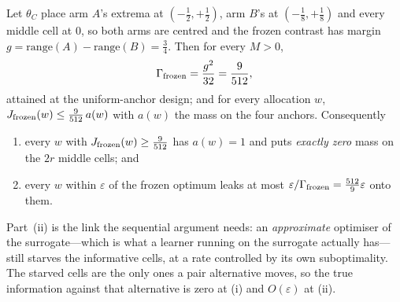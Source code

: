 

\begin{theorem}
\label{thm:starve}
Let $\theta_{C}$ place arm $A$'s extrema at $(-\tfrac12,+\tfrac12)$, arm $B$'s at
$(-\tfrac18,+\tfrac18)$ and every middle cell at $0$, so both arms are centred and the
frozen contrast has margin $g=\mathrm{range}(A)-\mathrm{range}(B)=\tfrac34$. Then for every
$M>0$,
\[
\Gamma_{\rm frozen}=\frac{g^{2}}{32}=\frac{9}{512},
\]
attained at the uniform-anchor design; and for every allocation $w$,
$J_{\rm frozen}(w)\le\tfrac{9}{512}\,a(w)$ with $a(w)$ the mass on the four anchors.
Consequently
\begin{enumerate}
\item[(i)] every $w$ with $J_{\rm frozen}(w)\ge\tfrac{9}{512}$ has $a(w)=1$ and puts
\emph{exactly zero} mass on the $2r$ middle cells; and
\item[(ii)] every $w$ within $\varepsilon$ of the frozen optimum leaks at most
$\varepsilon/\Gamma_{\rm frozen}=\tfrac{512}{9}\varepsilon$ onto them.
\end{enumerate}
\end{theorem}

Part~(ii) is the link the sequential argument needs: an \emph{approximate} optimiser of the
surrogate---which is what a learner running on the surrogate actually has---still starves
the informative cells, at a rate controlled by its own suboptimality. The starved cells are
the only ones a pair alternative moves, so the true information against that alternative is
zero at (i) and $O(\varepsilon)$ at (ii).


